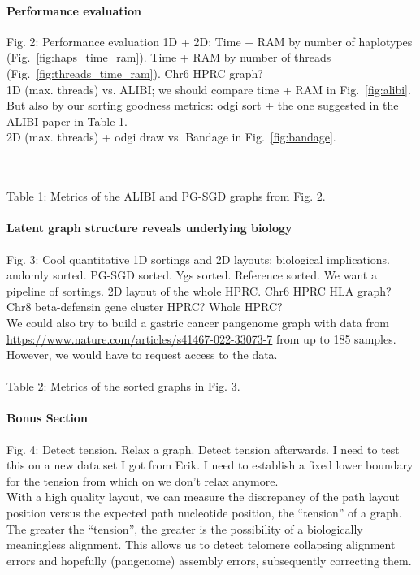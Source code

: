 \documentclass[11pt,hidelinks]{article}
\begin{document}


\paragraph{Performance evaluation}
Fig. 2: Performance evaluation 1D + 2D: Time + RAM by number of haplotypes (Fig.~\ref{fig:haps_time_ram}). Time + RAM by number of threads (Fig.~\ref{fig:threads_time_ram}). Chr6 HPRC graph?
\\
1D (max. threads) vs. ALIBI; we should compare time + RAM in Fig.~\ref{fig:alibi}.
But also by our sorting goodness metrics: odgi sort + the one suggested in the ALIBI paper in Table 1.
\\
2D (max. threads) + odgi draw vs. Bandage in Fig.~\ref{fig:bandage}.

\\
\\
Table 1: Metrics of the ALIBI and PG-SGD graphs from Fig. 2.

\paragraph{Latent graph structure reveals underlying biology}
Fig. 3: Cool quantitative 1D sortings and 2D layouts: biological implications.
andomly sorted. PG-SGD sorted. Ygs sorted. Reference sorted.
We want a pipeline of sortings. 2D layout of the whole HPRC.
Chr6 HPRC HLA graph? Chr8 beta-defensin gene cluster HPRC? Whole HPRC?
\\
We could also try to build a gastric cancer pangenome graph with data from \url{https://www.nature.com/articles/s41467-022-33073-7} from up to 185 samples.
However, we would have to request access to the data.
\\
\\

Table 2: Metrics of the sorted graphs in Fig. 3.

\paragraph{Bonus Section}
Fig. 4: Detect tension. Relax a graph. Detect tension afterwards.
I need to test this on a new data set I got from Erik.
I need to establish a fixed lower boundary for the tension from which on we don't relax anymore. \\
With a high quality layout, we can measure the discrepancy of the path layout position versus the expected path nucleotide position, the “tension” of a graph.
The greater the “tension”, the greater is the possibility of a biologically meaningless alignment.
This allows us to detect telomere collapsing alignment errors and hopefully (pangenome) assembly errors, subsequently correcting them.

\end{document}
